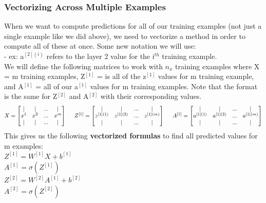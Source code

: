\documentclass[11pt, a4paper]{article}
\begin{document}
\begin{spacing}{1.1}
	\subsubsection{Vectorizing Across Multiple Examples}
	When we want to compute predictions for all of our training examples (not just a single example like we did above), we need to vectorize a method in order to compute all of these at once. Some new notation we will use: \vspace*{1mm} \\
	\hspace*{3mm} - ex: a$^{[2](i)}$ refers to the layer 2 value for the i$^{th}$ training example. \vspace*{1mm} \\
	We will define the following matrices to work with $n_x$ training examples where X = m training examples, Z$^{[1]}$ = is all of the z$^{[1]}$ values for m training example, and A$^{[1]}$ = all of our a$^{[1]}$ values for m training examples. Note that the format is the same for Z$^{[2]}$ and A$^{[2]}$ with their corresponding values. $$ X = \begin{bmatrix} | & | & ... & | \\ x^1 & x^2 & ... & x^m \\ | & | & ... & | \end{bmatrix} \hspace*{5mm} Z^{[1]} = \begin{bmatrix} | & | & ... & | \\ z^{[1](1)} & z^{[1](2)}  & ... & z^{[1](m)}  \\ | & | & ... & | \end{bmatrix} \hspace*{5mm} A^{[1]} = \begin{bmatrix} | & | & ... & | \\ a^{[1](1)} & a^{[1](2)}  & ... & a^{[1](m)}  \\ | & | & ... & | \end{bmatrix} $$
	This gives us the following \textbf{vectorized formulas} to find all predicted values for m examples: \vspace*{1mm} \\
	\hspace*{3mm} $Z^{[1]} = W^{[1]}X + b^{[1]}$  \vspace*{1mm} \\
	\hspace*{3mm} $A^{[1]} = \sigma(Z^{[1]})$  \vspace*{1mm} \\
	\hspace*{3mm} $Z^{[2]} = W^{[2]}A^{[1]} + b^{[2]}$  \vspace*{1mm} \\
	\hspace*{3mm} $A^{[2]} = \sigma(Z^{[2]})$ \vspace*{2mm} \\
	
	
	
	
	
	
\end{spacing}
\end{document}
